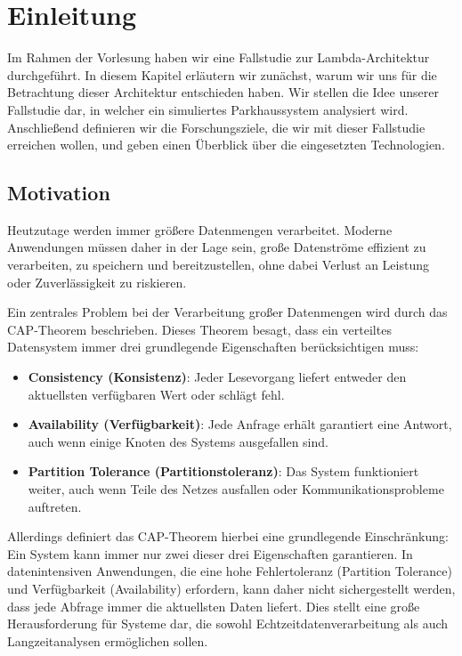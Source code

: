 \chapter{Einleitung}

Im Rahmen der Vorlesung  haben wir eine Fallstudie zur Lambda-Architektur durchgeführt.
In diesem Kapitel erläutern wir zunächst, warum wir uns für die Betrachtung dieser Architektur entschieden haben. 
Wir stellen die Idee unserer Fallstudie dar, in welcher ein simuliertes Parkhaussystem analysiert wird.
Anschließend definieren wir die Forschungsziele, die wir mit dieser Fallstudie erreichen wollen,
und geben einen Überblick über die eingesetzten Technologien.

\section{Motivation}
Heutzutage werden immer größere Datenmengen verarbeitet. Moderne Anwendungen müssen daher in der Lage sein, große Datenströme effizient zu verarbeiten, zu speichern und bereitzustellen, ohne dabei Verlust an Leistung oder Zuverlässigkeit zu riskieren.

Ein zentrales Problem bei der Verarbeitung großer Datenmengen wird durch das CAP-Theorem beschrieben. Dieses Theorem besagt, dass ein verteiltes Datensystem immer drei grundlegende Eigenschaften berücksichtigen muss:
\begin{itemize}
	\item \textbf{Consistency (Konsistenz)}: Jeder Lesevorgang liefert entweder den aktuellsten verfügbaren Wert oder schlägt fehl.
	\item \textbf{Availability (Verfügbarkeit)}: Jede Anfrage erhält garantiert eine Antwort, auch wenn einige Knoten des Systems ausgefallen sind.
	\item \textbf{Partition Tolerance (Partitionstoleranz)}: Das System funktioniert weiter, auch wenn Teile des Netzes ausfallen oder Kommunikationsprobleme auftreten.
\end{itemize}

Allerdings definiert das CAP-Theorem hierbei eine grundlegende Einschränkung:
Ein System kann immer nur zwei dieser drei Eigenschaften garantieren. 
In datenintensiven Anwendungen, die eine hohe Fehlertoleranz (Partition Tolerance) und Verfügbarkeit (Availability) erfordern, kann daher nicht sichergestellt werden, dass jede Abfrage immer die aktuellsten Daten liefert. Dies stellt eine große Herausforderung für Systeme dar, die sowohl Echtzeitdatenverarbeitung als auch Langzeitanalysen ermöglichen sollen.

